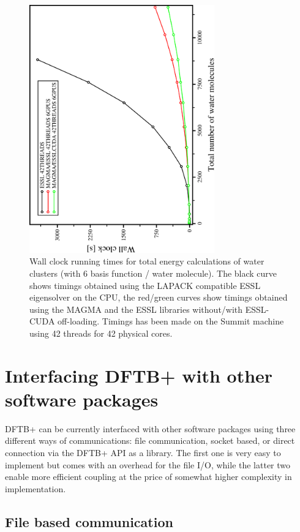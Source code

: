 \documentclass{revtex4-1}
\newcommand{\dftbp}{DFTB+}
\begin{document}
\begin{figure}[htbp]
  \centering
  \includegraphics[width=8cm,angle=270]{summit-h2o.pdf}
  \caption{Wall clock running times for total energy calculations of water
    clusters (with 6 basis function / water molecule). The black curve shows
    timings obtained using the LAPACK compatible ESSL eigensolver on the CPU,
    the red/green curves show timings obtained using the MAGMA and the ESSL
    libraries without/with ESSL-CUDA off-loading. Timings has been made on the
    Summit machine using 42 threads for 42 physical cores.}
  \label{fig:gpu}
\end{figure}


\section{Interfacing \dftbp{} with other software packages}

\dftbp{} can be currently interfaced with other software packages using three
different ways of communications: file communication, socket based, or direct
connection via the \dftbp{} API as a library. The first one is very easy to
implement but comes with an overhead for the file I/O, while the latter two
enable more efficient coupling at the price of somewhat higher complexity in
implementation.

\subsection{File based communication}
\end{document}
